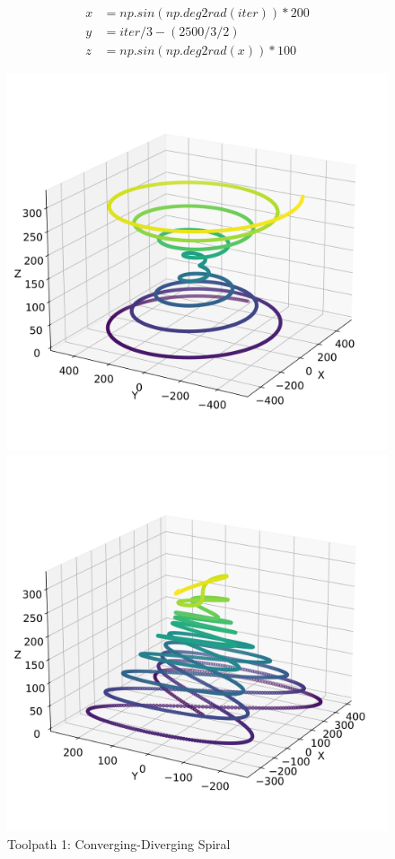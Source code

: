\begin{equation}\label{eq3}
\begin{split}
x &= np.sin(np.deg2rad(iter)) * 200\\
y &= iter / 3 - (2500/3/2)\\
z &= np.sin(np.deg2rad(x))*100
\end{split}
\end{equation}


\begin{figure}[H]%
	\centering
	\begin{minipage}{0.5\textwidth}
		\includegraphics[width=\textwidth]{figures/path1.png}
		\caption{Toolpath 1: Converging-Diverging Spiral}
		\label{path1}
	\end{minipage}\hfill
	\begin{minipage}{0.5\textwidth}
		\includegraphics[width=\textwidth]{figures/path2.png}

\end{minipage}
\end{figure}
